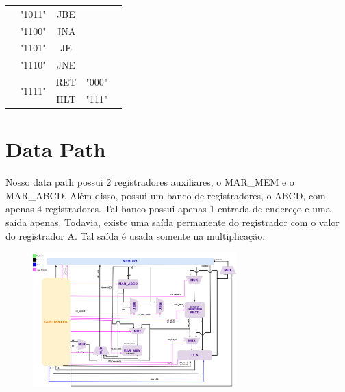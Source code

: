 \documentclass[12pt]{article}
\begin{document}
\begin{table}[!htbp]
\begin{tabular}{|c|c|c|c|c}
                    & "1011"                  & JBE                  &                        & \multicolumn{1}{c|}{}                                   \\ \cline{2-3} \cline{5-5} 
                    & "1100"                  & JNA                  &                        & \multicolumn{1}{c|}{}                                   \\ \cline{2-3} \cline{5-5} 
                    & "1101"                  & JE                   &                        & \multicolumn{1}{c|}{}                                   \\ \cline{2-3} \cline{5-5} 
                    & "1110"                  & JNE                  &                        & \multicolumn{1}{c|}{}                                   \\ \cline{2-5} 
                    & \multirow{2}{*}{"1111"} & RET                  & "000"                  & \multicolumn{1}{c|}{}                                   \\ \cline{3-5} 
                    &                         & HLT                  & "111"                  &                                                         \\ \cline{1-4}
\end{tabular}
\end{table}

\section{Data Path}
Nosso data path possui 2 registradores auxiliares, o  MAR\_MEM e o MAR\_ABCD. Além disso, possui um banco de registradores, o ABCD, com apenas 4 registradores. Tal banco possui apenas 1 entrada de endereço e uma saída apenas. Todavia, existe uma saída permanente do registrador com o valor do registrador A. Tal saída é usada somente na multiplicação.

\begin{figure}[!htb]
\centering
\includegraphics[width=0.7\textwidth]{datapath.png}
\end{figure}
\end{document}
